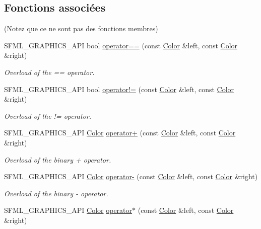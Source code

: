 \subsection*{Fonctions associées}
(Notez que ce ne sont pas des fonctions membres) \begin{DoxyCompactItemize}
\item 
S\+F\+M\+L\+\_\+\+G\+R\+A\+P\+H\+I\+C\+S\+\_\+\+A\+PI bool \hyperlink{classsf_1_1Color_a7498d4670c7655e8d4d91ef49cc6064e}{operator==} (const \hyperlink{classsf_1_1Color}{Color} \&left, const \hyperlink{classsf_1_1Color}{Color} \&right)
\begin{DoxyCompactList}\small\item\em Overload of the == operator. \end{DoxyCompactList}\item 
S\+F\+M\+L\+\_\+\+G\+R\+A\+P\+H\+I\+C\+S\+\_\+\+A\+PI bool \hyperlink{classsf_1_1Color_a5d6501b7dd05f481b79f7163899f1d92}{operator!=} (const \hyperlink{classsf_1_1Color}{Color} \&left, const \hyperlink{classsf_1_1Color}{Color} \&right)
\begin{DoxyCompactList}\small\item\em Overload of the != operator. \end{DoxyCompactList}\item 
S\+F\+M\+L\+\_\+\+G\+R\+A\+P\+H\+I\+C\+S\+\_\+\+A\+PI \hyperlink{classsf_1_1Color}{Color} \hyperlink{classsf_1_1Color_a90e79ecc276114cda519a88119ac645b}{operator+} (const \hyperlink{classsf_1_1Color}{Color} \&left, const \hyperlink{classsf_1_1Color}{Color} \&right)
\begin{DoxyCompactList}\small\item\em Overload of the binary + operator. \end{DoxyCompactList}\item 
S\+F\+M\+L\+\_\+\+G\+R\+A\+P\+H\+I\+C\+S\+\_\+\+A\+PI \hyperlink{classsf_1_1Color}{Color} \hyperlink{classsf_1_1Color_a6d9047ddbcec2bbab8519d93300bb2aa}{operator-\/} (const \hyperlink{classsf_1_1Color}{Color} \&left, const \hyperlink{classsf_1_1Color}{Color} \&right)
\begin{DoxyCompactList}\small\item\em Overload of the binary -\/ operator. \end{DoxyCompactList}\item 
S\+F\+M\+L\+\_\+\+G\+R\+A\+P\+H\+I\+C\+S\+\_\+\+A\+PI \hyperlink{classsf_1_1Color}{Color} \hyperlink{classsf_1_1Color_aa9de267d831b4ec8ba65b627e51d50c3}{operator$\ast$} (const \hyperlink{classsf_1_1Color}{Color} \&left, const \hyperlink{classsf_1_1Color}{Color} \&right)

\end{DoxyCompactItemize}
